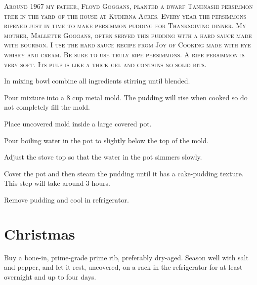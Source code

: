 \documentclass[letterpaper]{recipePMG}
\begin{document}
\textsc{Around 1967 my father, Floyd Goggans, planted a dwarf Tanenashi
persimmon tree in the yard of the house at Kuderna Acres.  Every
year the persimmons ripened just in time to make persimmon pudding
for Thanksgiving dinner. My mother,  Mallette Goggans, often served this pudding with
a hard sauce made with bourbon.  I use the hard sauce recipe from
Joy of Cooking made with rye whisky and cream. Be sure to use
truly ripe persimmons.  A ripe persimmon is very soft. Its pulp is
like a thick gel and contains no solid bits.}

In mixing bowl combine all ingredients stirring until blended.

Pour mixture into a 8 cup metal mold. The pudding will
rise when cooked so do not completely fill the mold.

Place uncovered mold inside a large covered pot.

Pour boiling water in the pot to slightly below the top of the mold.

Adjust the stove top so that the water in the pot simmers slowly.

Cover the pot and then steam the pudding until it has a cake-pudding
texture.  This step will take around 3 hours.

Remove pudding and cool in refrigerator.

\chapter{Christmas}


\newpage

\label{PrimeRibRoastOven}

Buy a bone-in, prime-grade prime rib, preferably dry-aged. Season well with salt and pepper, and let it rest, uncovered, on a rack in the refrigerator for at least overnight and up to four days. 
\end{document}
